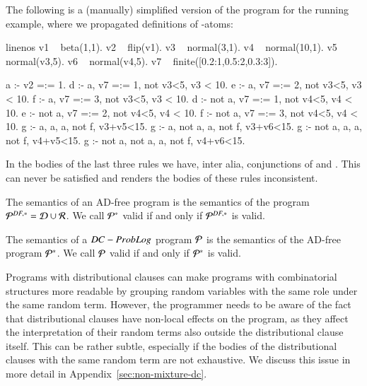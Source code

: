 \begin{example}\label{ex:running-sugar-simplified}
	The following is a (manually) simplified version of the \dfplpsty program for the running example, where we propagated definitions of  -atoms:
	\begin{problog*}{linenos}
v1 ~ beta(1,1).
v2 ~ flip(v1).
v3 ~ normal(3,1).
v4 ~ normal(10,1).
v5 ~ normal(v3,5).
v6 ~ normal(v4,5).
v7 ~ finite([0.2:1,0.5:2,0.3:3]).

a :- v2 =:= 1.
d :- a,     v7 =:= 1, not v3<5, v3 < 10.
e :- a,     v7 =:= 2, not v3<5, v3 < 10.
f :- a,     v7 =:= 3, not v3<5, v3 < 10.
d :- not a, v7 =:= 1, not v4<5, v4 < 10.
e :- not a, v7 =:= 2, not v4<5, v4 < 10.
f :- not a, v7 =:= 3, not v4<5, v4 < 10.
g :- a,     a,     a, not f, v3+v5<15.
g :- a,     not a, a, not f, v3+v6<15.  %
g :- not a, a,     a, not f, v4+v5<15.  %
g :- not a, not a, a, not f, v4+v6<15.  %
	\end{problog*}
	In the bodies of the last three rules we have, inter alia, conjunctions of  and . This can never be satisfied and renders the bodies of these rules inconsistent.
\end{example}


\begin{definition}
	\label{def:semantics_adfree}
	The semantics of an AD-free \dcproblogsty program \adfreeprogram is the semantics of the \dfplpsty program $ {{\mathcal{P}}^{DF,*}} = \mathcal{D} \cup {\mathcal{R}}$. We call ${{\mathcal{P}}^{*}}$ valid if and only if ${{\mathcal{P}}^{DF,*}}$ is valid.
\end{definition}

\begin{definition}
	The semantics of a $DC-ProbLog$ program ${\mathcal{P}}$ is the semantics of the AD-free \dcproblogsty program ${{\mathcal{P}}^{*}}$. We call ${\mathcal{P}}$ valid if and only if ${{\mathcal{P}}^{*}}$ is valid.
\end{definition}

Programs with distributional clauses can make programs with combinatorial structures more readable by grouping random variables with the same role  under the same random term. However, the programmer needs to be aware of the fact that distributional clauses have non-local effects on the program, as they affect the interpretation of their random terms also outside the distributional clause itself. This can be rather subtle, especially  if the bodies of the distributional clauses with the same random term are not exhaustive.
We discuss this issue in more detail in Appendix~\ref{sec:non-mixture-dc}.

